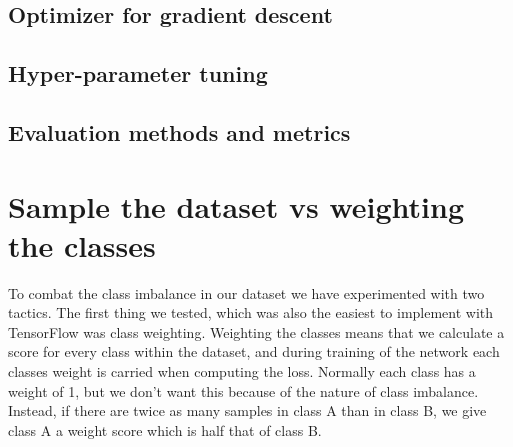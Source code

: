 \documentclass[thesis.tex]{subfiles}
\begin{document}
\subsection{Optimizer for gradient descent}





\subsection{Hyper-parameter tuning}




\subsection{Evaluation methods and metrics}






\section{Sample the dataset vs weighting the classes}
To combat the class imbalance in our dataset we have experimented with two tactics. The first thing we tested, which was also the easiest to implement with TensorFlow was class weighting. Weighting the classes means that we calculate a score for every class within the dataset, and during training of the network each classes weight is carried when computing the loss. Normally each class has a weight of 1, but we don't want this because of the nature of class imbalance. Instead, if there are twice as many samples in class A than in class B, we give class A a weight score which is half that of class B.
\end{document}

